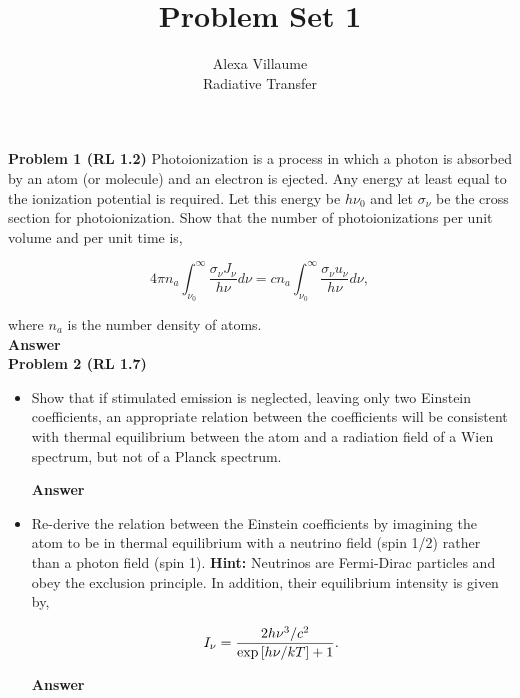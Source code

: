 \documentclass[12pt]{article}
\begin{document}
 
 \title{Problem Set 1}
\author{Alexa Villaume\\ 
Radiative Transfer} 
 
\maketitle

\noindent \textbf{Problem 1 (RL 1.2)} Photoionization is a process in which a photon is absorbed by an atom (or molecule) and an electron is ejected. Any energy at least equal to the ionization potential is required. Let this energy be $h\nu_0$ and let $\sigma_\nu$ be the cross section for photoionization. Show that the number of photoionizations per unit volume and per unit time is,

\begin{equation*}
4\pi n_a \int_{\nu_0}^{\infty} \frac{\sigma_\nu J_\nu}{h\nu}d\nu = cn_a\int_{\nu_0}^\infty\frac{\sigma_\nu u_\nu}{h\nu}d\nu,
\end{equation*}

\noindent where $n_a$ is the number density of atoms.\\

\noindent \textbf{Answer} \\

\noindent \textbf{Problem 2 (RL 1.7)} 

\begin{itemize}

\item Show that if stimulated emission is neglected, leaving only two Einstein coefficients, an appropriate relation between the coefficients will be consistent with thermal equilibrium between the atom and a radiation field of a Wien spectrum, but not of a Planck spectrum. 

\textbf{Answer} \\


\item Re-derive the relation between the Einstein coefficients by imagining the atom to be in thermal equilibrium with a neutrino field (spin 1/2) rather than a photon field (spin 1). \textbf{Hint:} Neutrinos are Fermi-Dirac particles and obey the exclusion principle. In addition, their equilibrium intensity is given by,

\begin{equation*}
I_\nu = \frac{2h\nu^3 / c^2}{{\rm exp}\left[h\nu / kT\right] + 1}.
\end{equation*}

\textbf{Answer} \\


\end{itemize}
\end{document}

